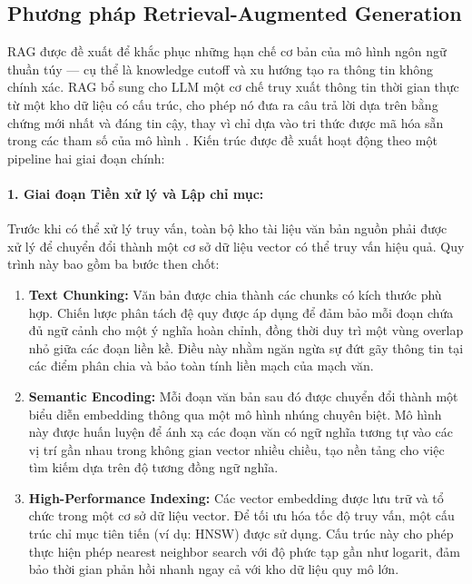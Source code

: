 \subsection{Phương pháp Retrieval-Augmented Generation}
\label{subsec:rag_implementation}

RAG được đề xuất để khắc phục những hạn chế cơ bản của mô hình ngôn ngữ thuần túy — cụ thể là knowledge cutoff và xu hướng tạo ra thông tin không chính xác. RAG bổ sung cho LLM một cơ chế truy xuất thông tin thời gian thực từ một kho dữ liệu có cấu trúc, cho phép nó đưa ra câu trả lời dựa trên bằng chứng mới nhất và đáng tin cậy, thay vì chỉ dựa vào tri thức được mã hóa sẵn trong các tham số của mô hình \cite{lewis2020rag}. Kiến trúc được đề xuất hoạt động theo một pipeline hai giai đoạn chính:

\paragraph{1. Giai đoạn Tiền xử lý và Lập chỉ mục:}
Trước khi có thể xử lý truy vấn, toàn bộ kho tài liệu văn bản nguồn phải được xử lý để chuyển đổi thành một cơ sở dữ liệu vector có thể truy vấn hiệu quả. Quy trình này bao gồm ba bước then chốt:

\begin{enumerate}
    \item \textbf{Text Chunking:} Văn bản được chia thành các chunks có kích thước phù hợp. Chiến lược phân tách đệ quy được áp dụng để đảm bảo mỗi đoạn chứa đủ ngữ cảnh cho một ý nghĩa hoàn chỉnh, đồng thời duy trì một vùng overlap nhỏ giữa các đoạn liền kề. Điều này nhằm ngăn ngừa sự đứt gãy thông tin tại các điểm phân chia và bảo toàn tính liền mạch của mạch văn.

    \item \textbf{Semantic Encoding:} Mỗi đoạn văn bản sau đó được chuyển đổi thành một biểu diễn embedding thông qua một mô hình nhúng chuyên biệt. Mô hình này được huấn luyện để ánh xạ các đoạn văn có ngữ nghĩa tương tự vào các vị trí gần nhau trong không gian vector nhiều chiều, tạo nền tảng cho việc tìm kiếm dựa trên độ tương đồng ngữ nghĩa.

    \item \textbf{High-Performance Indexing:}  
    Các vector embedding được lưu trữ và tổ chức trong một cơ sở dữ liệu vector. Để tối ưu hóa tốc độ truy vấn, một cấu trúc chỉ mục tiên tiến (ví dụ: HNSW) được sử dụng. Cấu trúc này cho phép thực hiện phép nearest neighbor search với độ phức tạp gần như logarit, đảm bảo thời gian phản hồi nhanh ngay cả với kho dữ liệu quy mô lớn.
\end{enumerate}

